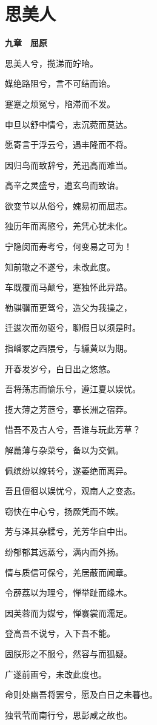 \documentclass[12pt,a4paper]{ctexbook}
\begin{document}
\section{思美人}
\textbf{九章　屈原}\par\vspace{0.5em}
思美人兮，揽涕而竚眙。\par
媒绝路阻兮，言不可结而诒。\par
蹇蹇之烦冤兮，陷滞而不发。\par
申旦以舒中情兮，志沉菀而莫达。\par
愿寄言于浮云兮，遇丰隆而不将。\par
因归鸟而致辞兮，羌迅高而难当。\par
高辛之灵盛兮，遭玄鸟而致诒。\par
欲变节以从俗兮，媿易初而屈志。\par
独历年而离愍兮，羌凭心犹未化。\par
宁隐闵而寿考兮，何变易之可为！\par
知前辙之不遂兮，未改此度。\par
车既覆而马颠兮，蹇独怀此异路。\par
勒骐骥而更驾兮，造父为我操之，\par
迁逡次而勿驱兮，聊假日以须是时。\par
指嶓冢之西隈兮，与纁黄以为期。\par
开春发岁兮，白日出之悠悠。\par
吾将荡志而愉乐兮，遵江夏以娱忧。\par
揽大薄之芳茝兮，搴长洲之宿莽。\par
惜吾不及古人兮，吾谁与玩此芳草？\par
解萹薄与杂菜兮，备以为交佩。\par
佩缤纷以缭转兮，遂萎绝而离异。\par
吾且儃徊以娱忧兮，观南人之变态。\par
窃快在中心兮，扬厥凭而不竢。\par
芳与泽其杂糅兮，羌芳华自中出。\par
纷郁郁其远蒸兮，满内而外扬。\par
情与质信可保兮，羌居蔽而闻章。\par
令薜荔以为理兮，惮举趾而缘木。\par
因芙蓉而为媒兮，惮褰裳而濡足。\par
登高吾不说兮，入下吾不能。\par
固朕形之不服兮，然容与而狐疑。\par
广遂前画兮，未改此度也。\par
命则处幽吾将罢兮，愿及白日之未暮也。\par
独茕茕而南行兮，思彭咸之故也。\par
\end{document}
